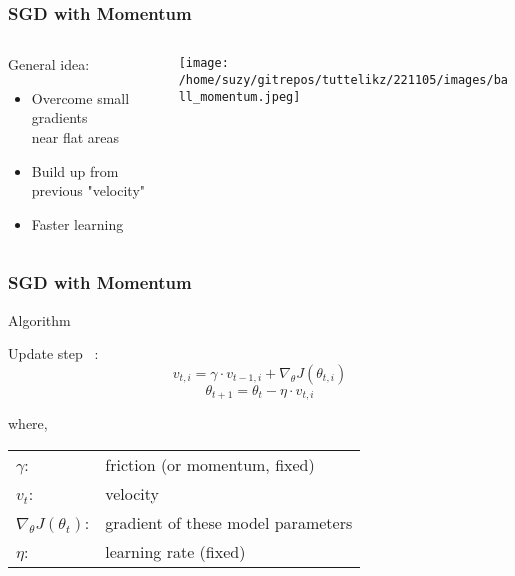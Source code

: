     \begin{frame}
      \frametitle{SGD with Momentum} %
      
      \begin{columns}
          \begin{column}{0.5\textwidth}
            General idea:
            \begin{itemize}
              \item Overcome small gradients \\ near flat areas
              \item Build up from previous "velocity"
              \item Faster learning
            \end{itemize}
          \end{column}
          \begin{column}{0.5\textwidth}  %
              \begin{center}
                \texttt{[image: /home/suzy/gitrepos/tuttelikz/221105/images/ball\_momentum.jpeg]}
              \end{center}
          \end{column}
      \end{columns}
    \end{frame}

    \begin{frame}
      \frametitle{SGD with Momentum}
      \begin{block}{Algorithm}

        Update step ~\cite{qian1999momentum}:
        \begin{equation}    %
          v_{t,i} = \gamma \cdot v_{t-1,i} + \nabla_{\theta}J(\theta_{t,i})
        \end{equation}
        \begin{equation}    %
          \theta_{t+1} = \theta_{t} - \eta \cdot v_{t,i}
        \end{equation}

        \vskip 0.3cm
        where, \\
        \begin{tabular}{l l}
          $\gamma$: & friction (or momentum, fixed) \\
          $v_{t}$: & velocity \\
          $\nabla_{\theta}J(\theta_t)$: & gradient of these model parameters \\
          $\eta$: & learning rate (fixed)
        \end{tabular}
      \end{block}
    \end{frame}

